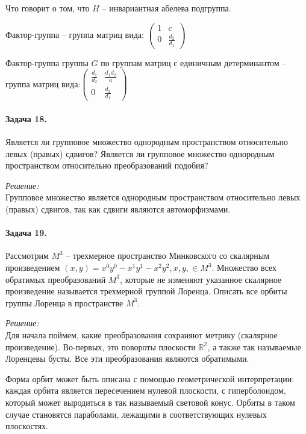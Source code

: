 \documentclass[10pt,a4paper]{article}
\begin{document}
	Что говорит о том, что $H$ -- инвариантная абелева подгруппа.
	
	Фактор-группа -- группа матриц вида: $\begin{pmatrix}
		1 & c\\ 
		0 & \frac{d_{2}}{d_{1}}
	\end{pmatrix}$
	
	Фактор-группа группы $G$ по группам матриц с единичным детерминантом -- 
	группа матриц вида:$\begin{pmatrix}
		\frac{d_{1}}{d_{2}} & \frac{d_{1}d_{2}}{a}\\
		0 & \frac{d_{2}}{d_{1}}
	\end{pmatrix}$ 	
	
	\paragraph{Задача 18.} Является ли групповое множество однородным 
	пространством относительно левых (правых) сдвигов? Является ли групповое 
	множество однородным пространством относительно преобразований подобия?
	
	\textit{Решение:}\\
	
	Групповое множество является однородным	пространством относительно левых 
	(правых) сдвигов, так как сдвиги являются автоморфизмами. 
	
	\paragraph{Задача 19.} Рассмотрим $M^{3}$ -- трехмерное пространство 
	Минковского со скалярным произведением $\left(x, y\right) = x^{0}y^{0} - 
	x^{1}y^{1} - x^{2}y^{2}, x, y, \in M^{3}$. Множество всех обратимых 
	преобразований $M^{3}$, которые не изменяют указанное скалярное произведение
	называется трехмерной группой Лоренца. Описать все орбиты группы Лоренца в 
	пространстве $M^{3}$.
	
	\textit{Решение:}\\
	
	Для начала поймем, какие преобразования сохраняют метрику (скалярное 	
	произведение). Во-первых, это повороты плоскости $\mathbb{R^{2}}$, а также 
	так называемые Лоренцевы бусты. Все эти преобразования являются обратимыми.
	
	Форма орбит может быть описана с помощью геометрической интерпретации: 
	каждая орбита является пересечением нулевой плоскости, с гиперболоидом, 
	который может выродиться в так называемый световой конус. Орбиты в таком 
	случае становятся параболами, лежащими в соответствующих нулевых плоскостях.
 	
\end{document}
